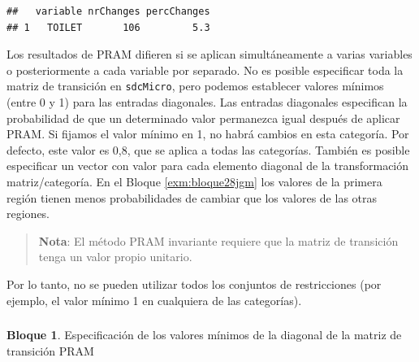 \documentclass[]{book}
\newenvironment{Shaded}{\begin{snugshade}}{\end{snugshade}}
\newcommand{\CommentTok}[1]{\textcolor[rgb]{0.56,0.35,0.01}{\textit{#1}}}
\newcommand{\DataTypeTok}[1]{\textcolor[rgb]{0.13,0.29,0.53}{#1}}
\newcommand{\DecValTok}[1]{\textcolor[rgb]{0.00,0.00,0.81}{#1}}
\newcommand{\KeywordTok}[1]{\textcolor[rgb]{0.13,0.29,0.53}{\textbf{#1}}}
\newcommand{\NormalTok}[1]{#1}
\newcommand{\OperatorTok}[1]{\textcolor[rgb]{0.81,0.36,0.00}{\textbf{#1}}}
\newcommand{\StringTok}[1]{\textcolor[rgb]{0.31,0.60,0.02}{#1}}
\theoremstyle{definition}
\theoremstyle{definition}
\newtheorem{example}{Bloque}[chapter]
\theoremstyle{definition}
\theoremstyle{definition}
\theoremstyle{remark}
\begin{document}
\begin{Shaded}
\end{Shaded}

\begin{verbatim}
##   variable nrChanges percChanges
## 1   TOILET       106         5.3
\end{verbatim}

Los resultados de PRAM difieren si se aplican simultáneamente a varias variables o posteriormente a cada variable por separado. No es posible especificar toda la matriz de transición en \texttt{sdcMicro}, pero podemos establecer valores mínimos (entre 0 y 1) para las entradas diagonales. Las entradas diagonales especifican la probabilidad de que un determinado valor permanezca igual después de aplicar PRAM. Si fijamos el valor mínimo en 1, no habrá cambios en esta categoría. Por defecto, este valor es 0,8, que se aplica a todas las categorías. También es posible especificar un vector con valor para cada elemento diagonal de la transformación matriz/categoría. En el Bloque \ref{exm:bloque28jgm} los valores de la primera región tienen menos probabilidades de cambiar que los valores de las otras regiones.

\begin{quote}
\textbf{Nota}: El método PRAM invariante requiere que la matriz de transición tenga un valor propio unitario.
\end{quote}

Por lo tanto, no se pueden utilizar todos los conjuntos de restricciones (por ejemplo, el valor mínimo 1 en cualquiera de las categorías).

\hypertarget{section-2}{%
\subsubsection{}\label{section-2}}

\begin{example}
\protect\hypertarget{exm:bloque28jgm}{}{\label{exm:bloque28jgm} }Especificación de los valores mínimos de la diagonal de la matriz de transición PRAM
\end{example}
\end{document}
